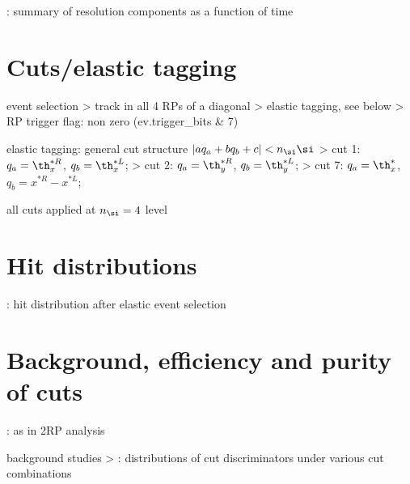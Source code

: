 \> : summary of resolution components as a function of time



\section{Cuts/elastic tagging}

\> event selection
\>> track in all 4 RPs of a diagonal
\>> elastic tagging, see below
\>> RP trigger flag: non zero (ev.trigger\_bits \& 7)

\> elastic tagging: general cut structure $| a q_a + b q_b + c| < n_\si  \si$
\>> cut 1: $q_a = \th_x^{*R}$, $q_b = \th_x^{*L}$; 
\>> cut 2: $q_a = \th_y^{*R}$, $q_b = \th_y^{*L}$; 
\>> cut 7: $q_a = \th_x^*$, $q_b = x^{*R} - x^{*L}$; 

\> all cuts applied at $n_\si = 4$ level

\TODO
\iffalse
\> \plot{cut_parameters_vs_time.pdf} : cut parameters as function of time
\>> mean: maximum offset from zero about $0.15\un{\si}$
\>>> negligible impact as cuts applied at $n_\si$
\>> sigma: taking the maximum for cuts
\>>> cut 1: $\si = 14\un{\mu rad}$
\>>> cut 2: $\si = 0.4\un{\mu rad}$
\fi



\section{Hit distributions}

\> : hit distribution after elastic event selection



\section{Background, efficiency and purity of cuts}

\TODO: as in 2RP analysis


\> background studies
\>> : distributions of cut discriminators under various cut combinations

